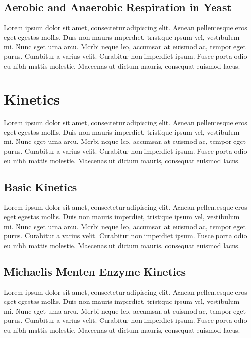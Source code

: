 \documentclass[12pt]{article}
\begin{document}
\subsection{Aerobic and Anaerobic Respiration in Yeast}
Lorem ipsum dolor sit amet, consectetur adipiscing elit. Aenean pellentesque eros eget egestas mollis. Duis non mauris imperdiet, tristique ipsum vel, vestibulum mi. Nunc eget urna arcu. Morbi neque leo, accumsan at euismod ac, tempor eget purus. Curabitur a varius velit. Curabitur non imperdiet ipsum. Fusce porta odio eu nibh mattis molestie. Maecenas ut dictum mauris, consequat euismod lacus.

\section{Kinetics}
Lorem ipsum dolor sit amet, consectetur adipiscing elit. Aenean pellentesque eros eget egestas mollis. Duis non mauris imperdiet, tristique ipsum vel, vestibulum mi. Nunc eget urna arcu. Morbi neque leo, accumsan at euismod ac, tempor eget purus. Curabitur a varius velit. Curabitur non imperdiet ipsum. Fusce porta odio eu nibh mattis molestie. Maecenas ut dictum mauris, consequat euismod lacus.

\subsection{Basic Kinetics}
Lorem ipsum dolor sit amet, consectetur adipiscing elit. Aenean pellentesque eros eget egestas mollis. Duis non mauris imperdiet, tristique ipsum vel, vestibulum mi. Nunc eget urna arcu. Morbi neque leo, accumsan at euismod ac, tempor eget purus. Curabitur a varius velit. Curabitur non imperdiet ipsum. Fusce porta odio eu nibh mattis molestie. Maecenas ut dictum mauris, consequat euismod lacus.

\subsection{Michaelis Menten Enzyme Kinetics}
Lorem ipsum dolor sit amet, consectetur adipiscing elit. Aenean pellentesque eros eget egestas mollis. Duis non mauris imperdiet, tristique ipsum vel, vestibulum mi. Nunc eget urna arcu. Morbi neque leo, accumsan at euismod ac, tempor eget purus. Curabitur a varius velit. Curabitur non imperdiet ipsum. Fusce porta odio eu nibh mattis molestie. Maecenas ut dictum mauris, consequat euismod lacus.

\nocite{*}

\newpage

\printbibliography
\end{document}
